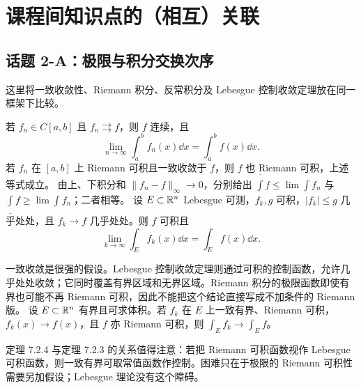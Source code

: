 \section{课程间知识点的（相互）关联}
\subsection*{话题 2-A：极限与积分交换次序}
这里将一致收敛性、Riemann 积分、反常积分及 Lebesgue 控制收敛定理放在同一框架下比较。

若 $f_n\in C[a,b]$ 且 $f_n\rightrightarrows f$，则 $f$ 连续，且
\[\lim_{n\to\infty}\int_a^b f_n(x)\dd x=\int_a^b f(x)\dd x.\]
若 $f_n$ 在 $[a,b]$ 上 Riemann 可积且一致收敛于 $f$，则 $f$ 也 Riemann 可积，上述等式成立。
\pf 由上、下积分和 $\|f_n-f\|_\infty\to0$，分别给出 $\overline{\int}f\le\lim\int f_n$ 与 $\underline{\int}f\ge\lim\int f_n$；二者相等。
设 $E\subset\mathbb R^n$ Lebesgue 可测，$f_k,g$ 可积，$|f_k|\le g$ 几乎处处，且 $f_k\to f$ 几乎处处。则 $f$ 可积且
\[\lim_{k\to\infty}\int_E f_k(x)\dd x=\int_E f(x)\dd x.\]
\par 一致收敛是很强的假设。Lebesgue 控制收敛定理则通过可积的控制函数，允许几乎处处收敛；它同时覆盖有界区域和无界区域。Riemann 积分的极限函数即使有界也可能不再 Riemann 可积，因此不能把这个结论直接写成不加条件的 Riemann 版。
设 $E\subset\mathbb R^n$ 有界且可求体积。若 $f_k$ 在 $E$ 上一致有界、Riemann 可积，$f_k(x)\to f(x)$，且 $f$ 亦 Riemann 可积，则 $\int_E f_k\to\int_E f$。
\par 定理 7.2.4 与定理 7.2.3 的关系值得注意：若把 Riemann 可积函数视作 Lebesgue 可积函数，则一致有界可取常值函数作控制。困难只在于极限的 Riemann 可积性需要另加假设；Lebesgue 理论没有这个障碍。

